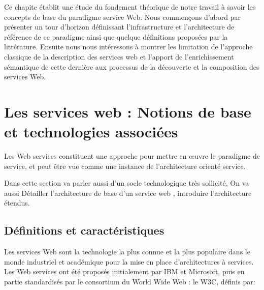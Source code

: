 


    Ce chapite établit une étude du fondement théorique de notre travail à savoir les concepts de base du paradigme
    service Web.  Nous commençons d'abord par présenter un tour d'horizon définissant l'infrastructure et
    l'architecture de référence de ce paradigme ainsi que quelque définitions proposées par la littérature. Ensuite
    nous nous intéressons à montrer les limitation de l'approche classique de la description des services web et l'apport
    de l'enrichissement sémantique de cette dernière aux processus de la découverte et la composition des services Web.\\

    \newpage
    
\section{Les services web : Notions de base et technologies associées} 
    Les Web services constituent une approche pour mettre en œuvre le paradigme de service, et peut être vue comme
    une instance de l'architecture orienté service.

    Dans cette section va parler aussi d'un socle technologique très sollicité, On va aussi Détailler l'architecture de base 
    d'un service web , introduire l'architecture étendus.

    \subsection{Définitions et caractéristiques}
	Les services Web sont la technologie la plus connue et la plus populaire dans le monde industriel et
	académique pour la mise en place d’architectures à services. Les Web services ont été proposés initialement par
	IBM et Microsoft, puis en partie standardisés par le consortium du World Wide Web : le W3C, définis par:

